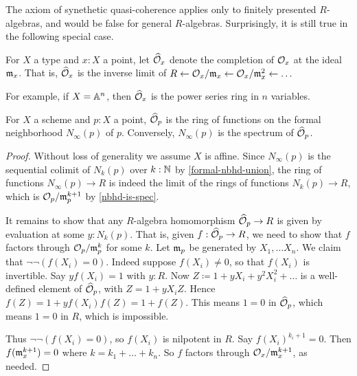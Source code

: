 The axiom of synethetic quasi-coherence applies only to finitely presented $R$-algebras,
and would be false for general $R$-algebras. Surprisingly, it is still true in 
the following special case.
\begin{definition} %
For $X$ a type and $x : X$ a point, let $\widehat {\mathcal{O}}_x$ denote the
completion of $\mathcal{O}_x$ at the ideal $\mathfrak{m}_x$. That is, $\widehat {\mathcal{O}}_x$ is 
the inverse limit of 
$R \leftarrow \mathcal{O}_x / \mathfrak{m}_x \leftarrow \mathcal{O}_x / \mathfrak{m}_x^2 \leftarrow \ldots$
\end{definition}
For example, if $X = \mathbb{A}^n$, then $\widehat {\mathcal{O}}_x$ is the power series ring
in $n$ variables.
\begin{lemma}
For $X$ a scheme and $p : X$ a point, $\widehat {\mathcal{O}}_p$ is the ring of functions
on the formal neighborhood $N_\infty(p)$ of $p$. Conversely,
$N_\infty(p)$ is the spectrum of $\widehat {\mathcal{O}}_p$.
\end{lemma}
\begin{proof}
Without loss of generality we assume $X$ is affine. Since $N_\infty(p)$ is the
sequential colimit of $N_k(p)$ over $k : \mathbb{N} $ by \cref{formal-nbhd-union}, the
ring of functions $N_\infty(p) \to R$ is indeed the limit of the rings of
functions $N_k(p) \to R$, which is $\mathcal{O}_p / \mathfrak{m}_p^{k+1}$ by \cref{nbhd-is-spec}.

It remains to show that any $R$-algebra homomorphism $\widehat {\mathcal{O}}_p \to R$
is given by evaluation at some $y : N_k(p)$. That is, given
$f : \widehat {\mathcal{O}}_p \to R$, we need to show that $f$ factors through
$\mathcal{O}_p / \mathfrak{m}_p^k$ for some $k$.
Let $\mathfrak{m}_p$ be generated by $X_1, \ldots X_n$.
We claim that $\neg \neg (f(X_i) = 0)$.
Indeed suppose $f(X_i) \ne 0$, so that $f(X_i)$ is invertible. Say
$yf(X_i) = 1$ with $y : R$. Now $Z \coloneqq 1 + yX_i + y^2X_i^2 + \ldots$
is a well-defined element of $\widehat {\mathcal{O}}_p$, with
$Z = 1 + yX_i Z$. Hence $f(Z) = 1 + y f(X_i)f(Z) = 1 + f(Z)$.
This means $1 = 0$ in $\widehat {\mathcal{O}}_p$, which means $1 = 0$ in $R$, which is impossible.

Thus $\neg \neg (f(X_i) = 0)$, so $f(X_i)$ is nilpotent in $R$.
Say $f(X_i)^{k_i+1} = 0$. Then $f(\mathfrak{m}_x^{k+1}) = 0$ where $k = k_1 + \ldots + k_n$.
So $f$ factors through $\mathcal{O}_x / \mathfrak{m}_x^{k+1}$, as needed.
\end{proof}
